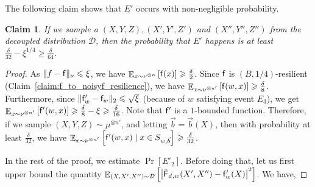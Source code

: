 \documentclass[10pt,a4paper]{amsart}
\newtheorem{claim}[thm]{Claim}
\newcommand\card[1]{\left| {#1} \right|}
\newcommand\Expect[2]{{\mathop{\mathbb{E}}_{#1}\left[ {#2} \right]}}
\renewcommand\geq{\geqslant}
\renewcommand\leq{\leqslant}
\newcommand{\V}[1]{{#1}}
\begin{document}
The following claim shows that $E'$ occurs with non-negligible probability.
\begin{claim}
    If we sample a $(X, Y, Z), (X', Y', Z')$ and $(X'', Y'', Z'')$ from the decoupled distribution $\mathcal{D}$, then the probability that $E'$ happens is at least 
    $\frac{\delta}{32} - \xi^{1/4}\geq \frac{\delta}{64}$.
\end{claim}
\begin{proof}

As $\|f-\noisyfcoarse\|_\nu\leq \xi$, we have $\Expect{\V x\sim \nu^{\otimes n}}{\noisyfcoarse(\V x)} \geq \frac{\delta}{2}$. Since $\mathsf{f}$ is $(B, 1/4)$-resilient (Claim~\ref{claim:f_to_noisyf_resilience}), we have $\Expect{\V x\sim \nu^{\otimes n'}}{\noisyfcoarse(\V w, \V x)}\geq \frac{\delta}{8}$. Furthermore, since $\|\noisyfrefined_{\V w} - \noisyfcoarse_{\V w}\|_2\leq \sqrt{\xi}$ (because of ${\V w}$ satisfying event $E_3$), we get $\Expect{\V x\sim \nu^{\otimes n'}}{\noisyfrefined(\V w, \V x)}\geq \frac{\delta}{8}-\xi \geq \frac{\delta}{16}$. Note that $\mathsf{f}'$ is a $1$-bounded function. Therefore, if we sample $(X, Y, Z)\sim \mu^{\otimes n'}$, and letting $\vec{b} = \vec{b}(\V X)$, then with probability at least $\frac{\delta}{32}$, we have $\Expect{\V x\sim \nu^{\otimes n'}}{\noisyfrefined(\V w, \V x) \mid \V x\in S_{\V w, \vec{b}}}\geq \frac{\delta}{32}$. 

In the rest of the proof, we estimate $\Pr[E'_2]$. Before doing that, let us first upper bound the quantity $\Expect{(X,X',X'')\sim \mathcal{D}}{\card{\truncfcoarsedecoupled_{,\V w}(X',X'') - \noisyfrefined_{\V w}(X)}^2}$. We have,


\end{proof}
\end{document}
